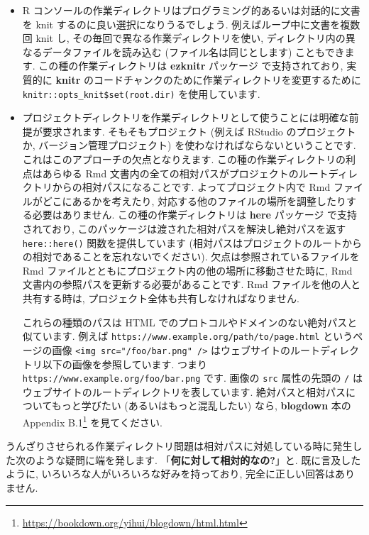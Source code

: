 \documentclass[
  11pt,
]{bxjsreport}
\renewcommand{\href}[2]{#2\footnote{\url{#1}}}
\begin{document}
\begin{itemize}
\item
  R コンソールの作業ディレクトリはプログラミング的あるいは対話的に文書を knit するのに良い選択になりうるでしょう. 例えばループ中に文書を複数回 knit し, その毎回で異なる作業ディレクトリを使い, ディレクトリ内の異なるデータファイルを読み込む (ファイル名は同じとします) こともできます. この種の作業ディレクトリは \textbf{ezknitr} パッケージ \autocite{R-ezknitr} で支持されており, 実質的に \textbf{knitr} のコードチャンクのために作業ディレクトリを変更するために \texttt{knitr::opts\_knit\$set(root.dir)} を使用しています.
\item
  プロジェクトディレクトリを作業ディレクトリとして使うことには明確な前提が要求されます. そもそもプロジェクト (例えば RStudio のプロジェクトか, バージョン管理プロジェクト) を使わなければならないということです. これはこのアプローチの欠点となりえます. この種の作業ディレクトリの利点はあらゆる Rmd 文書内の全ての相対パスがプロジェクトのルートディレクトリからの相対パスになることです. よってプロジェクト内で Rmd ファイルがどこにあるかを考えたり, 対応する他のファイルの場所を調整したりする必要はありません. この種の作業ディレクトリは \textbf{here} パッケージ \autocite{R-here} で支持されており, このパッケージは渡された相対パスを解決し絶対パスを返す \texttt{here::here()} 関数を提供しています (相対パスはプロジェクトのルートからの相対であることを忘れないでください). 欠点は参照されているファイルを Rmd ファイルとともにプロジェクト内の他の場所に移動させた時に, Rmd 文書内の参照パスを更新する必要があることです. Rmd ファイルを他の人と共有する時は, プロジェクト全体も共有しなければなりません.

  これらの種類のパスは HTML でのプロトコルやドメインのない絶対パスと似ています. 例えば \texttt{https://www.example.org/path/to/page.html} というページの画像 \texttt{\textless{}img\ src="/foo/bar.png"\ /\textgreater{}} はウェブサイトのルートディレクトリ以下の画像を参照しています. つまり \texttt{https://www.example.org/foo/bar.png} です. 画像の \texttt{src} 属性の先頭の \texttt{/} はウェブサイトのルートディレクトリを表しています. 絶対パスと相対パスについてもっと学びたい (あるいはもっと混乱したい) なら, \href{https://bookdown.org/yihui/blogdown/html.html}{\textbf{blogdown} 本の Appendix B.1} \autocite{blogdown2017} を見てください.
\end{itemize}

うんざりさせられる作業ディレクトリ問題は相対パスに対処している時に発生した次のような疑問に端を発します. 「\textbf{何に対して相対的なの?}」と. 既に言及したように, いろいろな人がいろいろな好みを持っており, 完全に正しい回答はありません.
\end{document}

